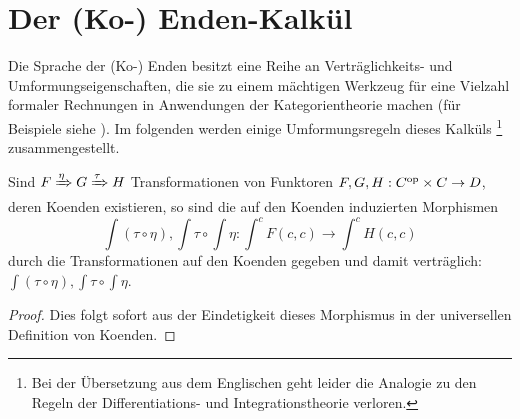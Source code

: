 \section{Der (Ko-) Enden-Kalkül}

Die Sprache der (Ko-) Enden besitzt eine Reihe an Verträglichkeits-
und Umformungseigenschaften, die sie zu einem mächtigen Werkzeug für
eine Vielzahl formaler Rechnungen in Anwendungen der Kategorientheorie
machen (für Beispiele siehe \cite{Lore}). Im folgenden werden einige
Umformungsregeln dieses Kalküls \footnote{Bei der Übersetzung
  aus dem Englischen geht leider die Analogie zu den Regeln der
  Differentiations- und Integrationstheorie verloren.}
zusammengestellt.


\begin{lemma}
  Sind $F \xRightarrow{\eta} G \xRightarrow{\tau} H$ Transformationen
  von Funktoren $F, G, H: C^\mathrm{op} \times C \to D$, deren Koenden
  existieren, so sind die auf den Koenden induzierten Morphismen
  \[ \int (\tau \circ \eta), \int \tau \circ \int \eta:
  \int^c F(c, c) \to \int^c H(c, c) \]
  durch die Transformationen auf den Koenden gegeben und damit
  verträglich: $\int (\tau \circ \eta), \int \tau \circ \int \eta$.
\end{lemma}
\begin{proof}
  Dies folgt sofort aus der Eindetigkeit dieses Morphismus in der
  universellen Definition von Koenden.
\end{proof}

